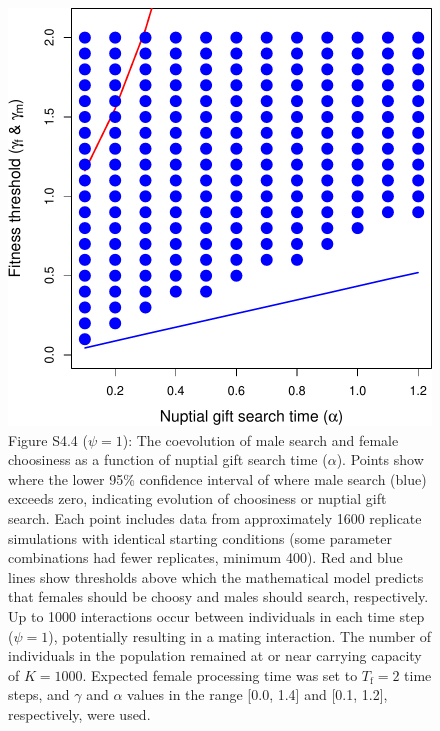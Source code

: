 \documentclass[
]{article}
\begin{document}
\captionsetup{labelformat=default}

\clearpage

\captionsetup{labelformat=empty}

\begin{figure}
\centering
\includegraphics{ms_refs_fixed_files/figure-latex/unnamed-chunk-9-1.pdf}
\caption{Figure S4.4 (\(\psi = 1\)): The coevolution of male search and
female choosiness as a function of nuptial gift search time
(\(\alpha\)). Points show where the lower 95\% confidence interval of
where male search (blue) exceeds zero, indicating evolution of
choosiness or nuptial gift search. Each point includes data from
approximately 1600 replicate simulations with identical starting
conditions (some parameter combinations had fewer replicates, minimum
400). Red and blue lines show thresholds above which the mathematical
model predicts that females should be choosy and males should search,
respectively. Up to 1000 interactions occur between individuals in each
time step (\(\psi = 1\)), potentially resulting in a mating interaction.
The number of individuals in the population remained at or near carrying
capacity of \(K = 1000\). Expected female processing time was set to
\(T_{\mathrm{f}}=2\) time steps, and \(\gamma\) and \(\alpha\) values in
the range {[}0.0, 1.4{]} and {[}0.1, 1.2{]}, respectively, were used.}
\end{figure}
\end{document}
